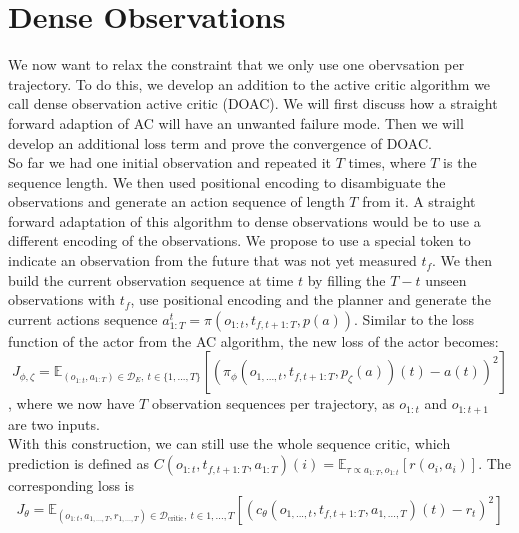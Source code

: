 \section{Dense Observations}
\label{sec:relax_dense}
We now want to relax the constraint that we only use one obervsation per trajectory. To do this, we develop an addition to the active critic algorithm we call dense observation active critic (DOAC). 
We will first discuss how a straight forward adaption of AC will have an unwanted failure mode. Then we will develop an additional loss term and prove the convergence of DOAC.\\

So far we had one initial observation and repeated it $T$ times, where $T$ is the sequence length. We then used positional encoding to disambiguate the observations and generate an action sequence of 
length $T$ from it. A straight forward adaptation of this algorithm to dense observations would be to use a different encoding of the observations. We propose to use a special token to indicate an 
observation from the future that was not yet measured $t_f$. We then build the current observation sequence at time $t$ by filling the $T - t$ unseen observations with $t_f$, use positional encoding and 
the planner and 
generate the current actions sequence $a^t_{1:T} = \pi(o_{1:t}, t_{f, t+1:T}, p(a))$. Similar to the loss function of the actor from the AC algorithm, the new loss of the actor becomes: 
\begin{equation}
    \label{dense_actor_objective}
    J_{\phi, \zeta} = \mathbb{E}_{(o_{1:t}, a_{1:T}) \in \mathcal{D}_E,\ t \in \{1, ..., T\}}\left[\left( \pi_{\phi}(o_{1, ..., t}, t_{f, t+1:T}, p_{\zeta}(a))(t) - a(t)\right)^2\right]
\end{equation}
, where we now have $T$ observation sequences per trajectory, as $o_{1:t}$ and $o_{1:t+1}$ are two inputs.\\
With this construction, we can still use the whole sequence critic, 
which prediction is defined as $C(o_{1:t}, t_{f, t+1:T}, a_{1:T})(i) = \mathbb{E}_{\tau \propto a_{1:T}, o_{1:t}}\left[r(o_i, a_i)\right]$. The corresponding loss is
\begin{equation}
    J_{\theta} = \mathbb{E}_{(o_{1:t}, a_{1,...,T}, r_{1,...,T}) \in \mathcal{D}_{\text{critic}},\ t \in {1, ..., T}}\left[(c_{\theta}(o_{1, ..., t}, t_{f, t+1:T},  a_{1,...,T})(t) - r_t)^2\right]
\end{equation}

